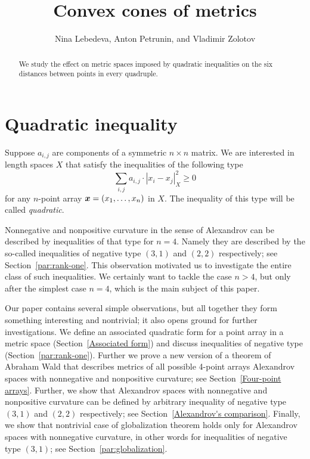 \documentclass[a4paper,10pt]{article}
\def\thetitle{Convex cones of metrics}
\def\theauthors{Nina Lebedeva, Anton Petrunin, and Vladimir Zolotov}
\begin{document}


\title{\thetitle}
\author{\theauthors}
\date{}
\maketitle

\begin{abstract}
We study the effect on metric spaces imposed by quadratic inequalities on the six distances between points in every quadruple.
\end{abstract}

\section{Quadratic inequality}\label{par:quadratic-inq}

Suppose $a_{i,j}$ are components of a symmetric $n{\times}n$ matrix.
We are interested in length spaces $X$ that
satisfy the inequalities of the following type
\[\sum_{i,j}a_{i,j}\cdot|x_i-x_j|_X^2\ge 0\]
for any $n$-point array $\bm{x}\z=(x_1,\dots,x_n)$ in $X$.
The inequality of this type will be called \emph{quadratic}.


Nonnegative and nonpositive curvature in the sense of Alexandrov can be described by inequalities of that type for $n=4$.
Namely they are described by the so-called inequalities of negative type $(3,1)$ and $(2,2)$ respectively; see Section~\ref{par:rank-one}.
This observation motivated us to investigate the entire class of such inequalities.
We certainly want to tackle the case $n>4$, but only after the simplest case $n=4$, which is the main subject of this paper.

Our paper contains several simple observations, but all together they form something interesting and nontrivial; it also opens ground for further investigations.
We define an associated quadratic form for a point array in a metric space (Section~\ref{Associated form})
and discuss inequalities of negative type (Section~\ref{par:rank-one}).
Further we prove a new version of a theorem of Abraham Wald \cite[§ 7]{wald} that describes metrics of all possible 4-point arrays Alexandrov spaces with nonnegative and nonpositive curvature;
see Section~\ref{Four-point arrays}.
Further, we show that Alexandrov spaces with nonnegative and nonpositive curvature can be defined by arbitrary inequality of negative type $(3,1)$ and $(2,2)$ respectively;
see Section~\ref{Alexandrov's comparison}.
Finally, we show that nontrivial case of globalization theorem holds only for Alexandrov spaces with nonnegative curvature, in other words for inequalities of negative type $(3,1)$;
see Section~\ref{par:globalization}.
\end{document}
